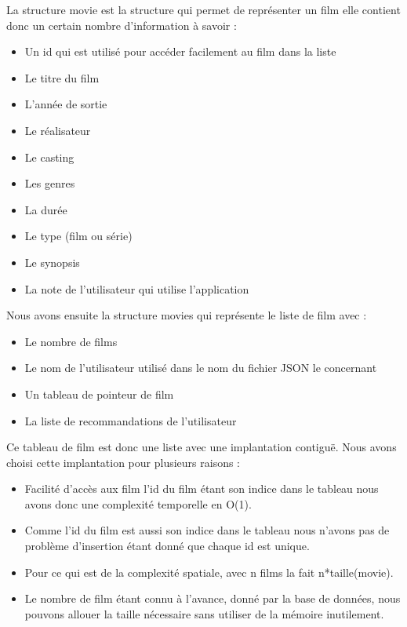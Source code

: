 \documentclass{article}
\begin{document}
La structure movie est la structure qui permet de représenter un film elle contient donc un certain nombre d’information à savoir : 
\begin{itemize}
    \item Un id qui est utilisé pour accéder facilement au film dans la liste
    \item Le titre du film
    \item L’année de sortie
    \item Le réalisateur
    \item Le casting
    \item Les genres
    \item La durée
    \item Le type (film ou série)
    \item Le synopsis
    \item La note de l’utilisateur qui utilise l’application
\end{itemize}
\vspace{3mm}
Nous avons ensuite la structure movies qui représente le liste de film avec :
\begin{itemize}
    \item Le nombre de films
    \item Le nom de l’utilisateur utilisé dans le nom du fichier JSON le concernant
    \item Un tableau de pointeur de film
    \item La liste de recommandations de l’utilisateur
\end{itemize}
\vspace{3mm}
Ce tableau de film est donc une liste avec une implantation contiguë. Nous avons choisi cette implantation pour plusieurs raisons :
\begin{itemize}
    \item Facilité d’accès aux film l’id du film étant son indice dans le tableau nous avons donc une complexité temporelle en O(1).
    \item Comme l’id du film est aussi son indice dans le tableau nous n’avons pas de problème d’insertion étant donné que chaque id est unique.
    \item Pour ce qui est de la complexité spatiale, avec n films la fait n*taille(movie).
    \item Le nombre de film étant connu à l’avance, donné par la base de données, nous pouvons allouer la taille nécessaire sans utiliser de la mémoire inutilement.
\end{itemize}
\end{document}

